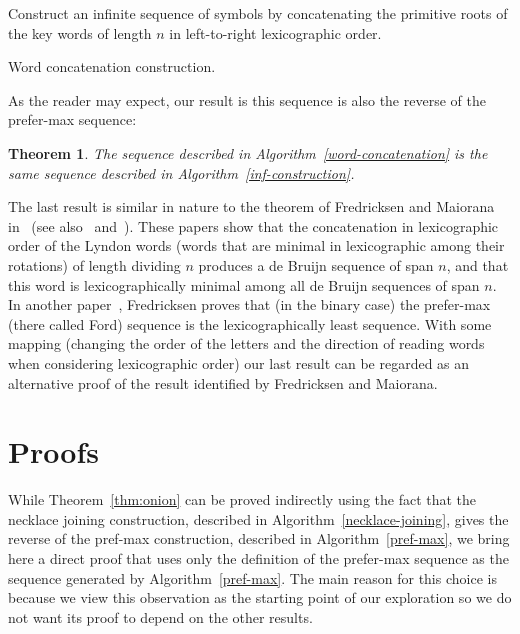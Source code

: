 \documentclass{article} %
\newtheorem{theorem}{Theorem} \newtheorem{proposition}[theorem]{Proposition}
\theoremstyle{definition} \newtheorem{definition}[theorem]{Definition}
\begin{document}
	
	\begin{algorithm}[!h]
		Construct an infinite sequence of symbols by
		concatenating the primitive roots of the key words of length $n$ in left-to-right lexicographic order.
		\caption{Word concatenation construction.} \label{word-concatenation}
	\end{algorithm}
	
	As the reader may expect, our result is this sequence is also the reverse of
	the prefer-max sequence:
	
	\begin{theorem}
		The sequence described in Algorithm~\ref{word-concatenation} is
		the same sequence described in Algorithm~\ref{inf-construction}. 
	\end{theorem}
	
	The last result is similar in nature to the theorem of Fredricksen and Maiorana
	in~\cite{Fredricksen1978} (see also~\cite{Moreno2004} and~\cite{Moreno2015}).
	These papers show that the concatenation in lexicographic order of the Lyndon
	words (words that are minimal in lexicographic among their rotations) of length
	dividing $n$ produces a de Bruijn sequence of span $n$, and that this word is
	lexicographically minimal among all de Bruijn sequences of span $n$. In another
	paper~\cite{Fredricksen1970}, Fredricksen proves that (in the binary case) the
	prefer-max (there called Ford) sequence is the lexicographically least
	sequence. With some mapping (changing the order of the letters and the
	direction of reading words when considering lexicographic order) our last
	result can be regarded as an alternative proof of the result identified by
	Fredricksen and Maiorana.
	
	
	\section{Proofs}
	
	While Theorem~\ref{thm:onion} can be proved indirectly using the fact that the
	necklace joining construction, described in Algorithm~\ref{necklace-joining},
	gives the reverse of the pref-max construction, described in
	Algorithm~\ref{pref-max}, we bring here a direct proof that uses only the
	definition of the prefer-max sequence as the sequence generated by
	Algorithm~\ref{pref-max}. The main reason for this choice is because we view
	this observation as the starting point of our exploration so we do not want its
	proof to depend on the other results.
	
\end{document}
